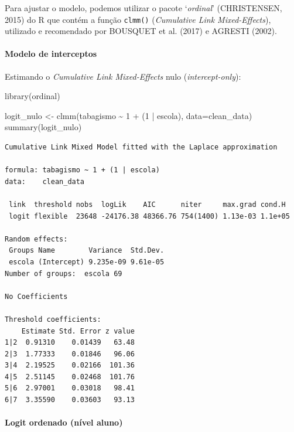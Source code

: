 \documentclass[
]{article}
\let\oldparagraph\paragraph
\renewcommand{\paragraph}[1]{\oldparagraph{#1}\mbox{}}
\newenvironment{Shaded}{\begin{snugshade}}{\end{snugshade}}
\newcommand{\AttributeTok}[1]{\textcolor[rgb]{0.40,0.45,0.13}{#1}}
\newcommand{\DecValTok}[1]{\textcolor[rgb]{0.68,0.00,0.00}{#1}}
\newcommand{\FunctionTok}[1]{\textcolor[rgb]{0.28,0.35,0.67}{#1}}
\newcommand{\NormalTok}[1]{\textcolor[rgb]{0.00,0.23,0.31}{#1}}
\newcommand{\OtherTok}[1]{\textcolor[rgb]{0.00,0.23,0.31}{#1}}
\newcommand{\SpecialCharTok}[1]{\textcolor[rgb]{0.37,0.37,0.37}{#1}}
\begin{document}
Para ajustar o modelo, podemos utilizar o pacote `\emph{ordinal}'
(CHRISTENSEN, 2015) do R que contém a função \texttt{clmm()}
(\emph{Cumulative Link Mixed-Effects}), utilizado e recomendado por
BOUSQUET et al. (2017) e AGRESTI (2002).

\hypertarget{modelo-de-interceptos}{%
\paragraph{Modelo de interceptos}\label{modelo-de-interceptos}}

Estimando o \emph{Cumulative Link Mixed-Effects} nulo
(\emph{intercept-only}):

\begin{Shaded}
\begin{Highlighting}[]
\FunctionTok{library}\NormalTok{(ordinal)}

\NormalTok{logit\_nulo }\OtherTok{\textless{}{-}} \FunctionTok{clmm}\NormalTok{(tabagismo }\SpecialCharTok{\textasciitilde{}} \DecValTok{1} \SpecialCharTok{+}\NormalTok{ (}\DecValTok{1} \SpecialCharTok{|}\NormalTok{ escola), }\AttributeTok{data=}\NormalTok{clean\_data)}
\FunctionTok{summary}\NormalTok{(logit\_nulo)}
\end{Highlighting}
\end{Shaded}

\begin{verbatim}
Cumulative Link Mixed Model fitted with the Laplace approximation

formula: tabagismo ~ 1 + (1 | escola)
data:    clean_data

 link  threshold nobs  logLik    AIC      niter     max.grad cond.H 
 logit flexible  23648 -24176.38 48366.76 754(1400) 1.13e-03 1.1e+05

Random effects:
 Groups Name        Variance  Std.Dev.
 escola (Intercept) 9.235e-09 9.61e-05
Number of groups:  escola 69 

No Coefficients

Threshold coefficients:
    Estimate Std. Error z value
1|2  0.91310    0.01439   63.48
2|3  1.77333    0.01846   96.06
3|4  2.19525    0.02166  101.36
4|5  2.51145    0.02468  101.76
5|6  2.97001    0.03018   98.41
6|7  3.35590    0.03603   93.13
\end{verbatim}

\hypertarget{logit-ordenado-nuxedvel-aluno}{%
\paragraph{Logit ordenado (nível
aluno)}\label{logit-ordenado-nuxedvel-aluno}}
\end{document}
